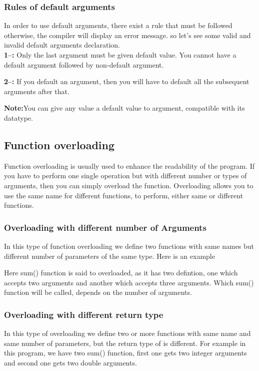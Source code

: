 \documentclass[11pt, a4paper]{article}
\begin{document}
\subsubsection{Rules of default arguments}
In order to use default arguments, there exist a rule that must be followed otherwise,
the compiler will display an error message. so let's see some valid and invalid default
arguments declaration.\\
\textbf{1--:} Only the last argument must be given default value. You cannot have
a default argument followed by non-default argument.

\textbf{2--:} If you default an argument, then you will have to default
all the subsequent arguments after that.

\textbf{Note:}You can give any value a default value to argument,
compatible with its datatype.

\subsection{Function overloading}
Function overloading is usually used to enhance the readability of the program.
If you have to perform one single operation but with different number or types
of arguments, then you can simply overload the function. Overloading allows you
to use the same name for different functions, to perform, either same or different
functions.

\subsubsection{Overloading with different number of Arguments}
In this type of function overloading we define two functions with same names
but different number of parameters of the same type. Here is an example

Here sum() function is said to overloaded, as it has two defintion,
one which accepts two arguments and another which accepts three arguments.
Which sum() function will be called, depends on the number of arguments.

\subsubsection{Overloading with different return type}
In this type of overloading we define two or more functions with same name and
same number of parameters, but the return type of is different. For example in
this program, we have two sum() function, first one gets two integer arguments and
second one gets two double arguments.

\end{document}
